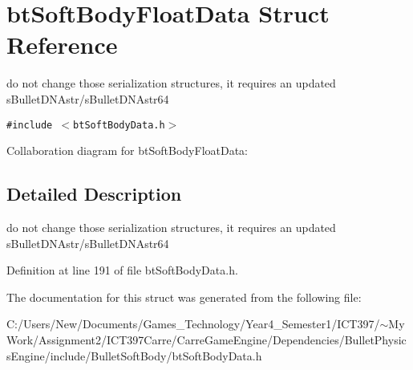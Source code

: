 \hypertarget{structbt_soft_body_float_data}{
\section{btSoftBodyFloatData Struct Reference}
\label{structbt_soft_body_float_data}
}
do not change those serialization structures, it requires an updated sBulletDNAstr/sBulletDNAstr64  


{\tt \#include $<$btSoftBodyData.h$>$}

Collaboration diagram for btSoftBodyFloatData:

\subsection{Detailed Description}
do not change those serialization structures, it requires an updated sBulletDNAstr/sBulletDNAstr64 

Definition at line 191 of file btSoftBodyData.h.

The documentation for this struct was generated from the following file:\begin{CompactItemize}
\item 
C:/Users/New/Documents/Games\_\-Technology/Year4\_\-Semester1/ICT397/$\sim$My Work/Assignment2/ICT397Carre/CarreGameEngine/Dependencies/BulletPhysicsEngine/include/BulletSoftBody/btSoftBodyData.h\end{CompactItemize}
